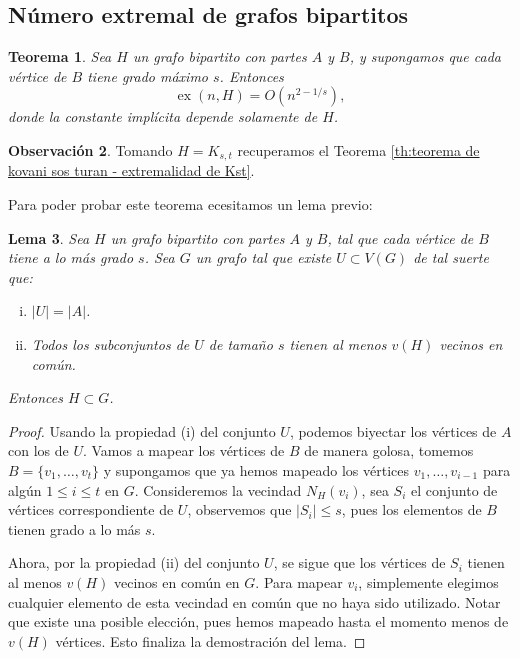 \documentclass[12pt]{report}
\theoremstyle{plain}
\newtheorem{theorem}{Teorema}[section]
\newtheorem{lemma}[theorem]{Lema}
\theoremstyle{definition}
\newtheorem{obs}[theorem]{Observación}
\newcommand{\abs}[1]{\left \vert #1 \right \vert}
\newcommand{\ex}[2]{\operatorname{ex} (#1, #2)}
\begin{document}
\subsection{Número extremal de grafos bipartitos}

\begin{theorem}
Sea $H$ un grafo bipartito con partes $A$ y $B$, y supongamos que cada vértice de $B$ tiene grado máximo $s$. Entonces
\[
\ex{n}{H} = O (n^{2- 1 / s}),
\]
donde la constante implícita depende solamente de $H$.
\end{theorem}

\begin{obs}
Tomando $H = K_{s,t}$ recuperamos el Teorema \ref{th:teorema de kovani sos turan - extremalidad de Kst}.
\end{obs}


Para poder probar este teorema ecesitamos un lema previo:
\begin{lemma}\label{lema:un lema sobre grafos bipartitos H para probar resultado del metodo probabilistico y numero extremal de H}
Sea $H$ un grafo bipartito con partes $A$ y $B$, tal que cada vértice de $B$ tiene a lo más grado $s$. Sea $G$ un grafo tal que existe $U \subset V(G)$ de tal suerte que:
\begin{enumerate}[(i)]
\item $\abs U = \abs A$.
\item Todos los subconjuntos de $U$ de tamaño $s$ tienen al menos $v(H)$ vecinos en común.
\end{enumerate}
Entonces $H \subset G$.
\end{lemma}
\begin{proof}
Usando la propiedad (i) del conjunto $U$, podemos biyectar los vértices de $A$ con los de $U$. Vamos a mapear los vértices de $B$ de manera golosa, tomemos $B = \{v_1, \ldots, v_t\}$ y supongamos que ya hemos mapeado los vértices $v_1, \ldots, v_{i-1}$ para algún $1 \leq i \leq t$ en $G$. Consideremos la vecindad $N_H (v_i)$, sea $S_i$ el conjunto de vértices correspondiente de $U$, observemos que $\abs{S_i} \leq s$, pues los elementos de $B$ tienen grado a lo más $s$.

Ahora, por la propiedad (ii) del conjunto $U$, se sigue que los vértices de $S_i$ tienen al menos $v(H)$ vecinos en común en $G$. Para mapear $v_i$, simplemente elegimos cualquier elemento de esta vecindad en común que no haya sido utilizado. Notar que existe una posible elección, pues hemos mapeado hasta el momento menos de $v(H)$ vértices. Esto finaliza la demostración del lema.
\end{proof}
\end{document}
